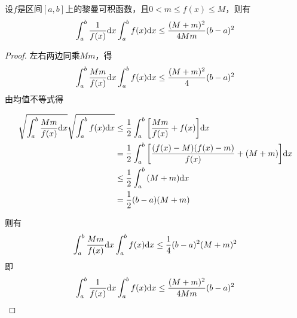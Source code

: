 \begin{theorem}
    
    设$f$是区间$[a, b]$上的黎曼可积函数，且$0 < m \leq f(x) \leq M$，则有
    \[\int_{a}^{b}{\dfrac{1}{f(x)}}\mathrm{d} x \int_{a}^{b}{f(x)}\mathrm{d} x \leq \dfrac{(M + m)^2}{4Mm}(b - a)^2 \]

\end{theorem}

\begin{proof}
    
    左右两边同乘$Mm$，得
    \[\int_{a}^{b}{\dfrac{Mm}{f(x)}}\mathrm{d} x \int_{a}^{b}{f(x)}\mathrm{d} x \leq \dfrac{(M + m)^2}{4}(b - a)^2\]
    由均值不等式得

    \begin{align*}
        \sqrt{\int_{a}^{b}{\dfrac{Mm}{f(x)}}\mathrm{d} x} \sqrt{\int_{a}^{b}{f(x)}\mathrm{d} x} & \leq \dfrac{1}{2} \int_{a}^{b}{\left[ \dfrac{Mm}{f(x)} + f(x) \right]}\mathrm{d} x \\
        & = \dfrac{1}{2} \int_{a}^{b}{\left[ \dfrac{(f(x) - M)(f(x) - m)}{f(x)} + (M + m) \right]}\mathrm{d} x \\
        & \leq \dfrac{1}{2} \int_{a}^{b}{(M + m)}\mathrm{d} x \\
        & = \dfrac{1}{2}(b - a)(M + m)
    \end{align*}

    则有
    \[\int_{a}^{b}{\dfrac{Mm}{f(x)}}\mathrm{d} x \int_{a}^{b}{f(x)}\mathrm{d} x \leq \dfrac{1}{4} (b - a)^2(M + m)^2\]
    即
    \[ \int_{a}^{b}{\dfrac{1}{f(x)}}\mathrm{d} x \int_{a}^{b}{f(x)}\mathrm{d} x \leq \dfrac{(M + m)^2}{4Mm}(b - a)^2 \]

\end{proof}